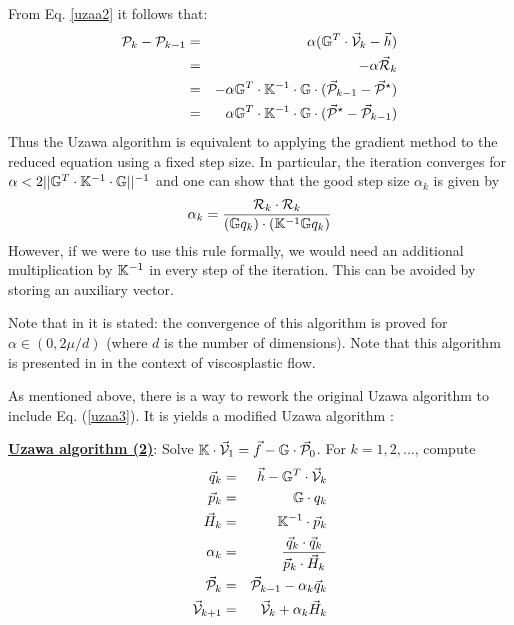 From Eq. \ref{uzaa2} it follows that:
\begin{eqnarray}
{\cal P}_k - {\cal P}_{k-1}  
&=& \alpha (\mathbb{G}^T\cdot \vec{\cal V}_k -\vec h) \\
&=& -\alpha \vec{\cal R}_k \\ 
&=& -\alpha \mathbb{G}^T \cdot \mathbb{K}^{-1} \cdot \mathbb{G}\cdot (\vec {\cal P}_{k-1} - \vec{\cal P}^\star)\\ 
&=& \alpha \mathbb{G}^T \cdot \mathbb{K}^{-1} \cdot \mathbb{G}\cdot 
(\vec{\cal P}^\star - \vec {\cal P}_{k-1} ) 
\end{eqnarray}
Thus the Uzawa algorithm is equivalent to applying the gradient method 
to the reduced equation using a fixed step size. 
In particular, the iteration converges for
$
\alpha < 2 || {\mathbb{G}}^T \cdot {\mathbb{K}}^{-1} \cdot {\mathbb{G}} ||^{-1}
$
and one can show that the good step size $\alpha_k$ is given by 
\begin{equation}
\alpha_k = \frac{{\cal R}_k \cdot {\cal R}_k}{({\mathbb{G}} q_k)\cdot ({\mathbb{K}}^{-1} {\mathbb{G}} q_k)}
\label{uzaa3}
\end{equation}
However, if we were to use this rule formally, we would 
need an additional multiplication by ${\mathbb{K}}^{-1}$ in every step 
of the iteration. This can be avoided by storing an 
auxiliary vector. 

Note that in \cite{glow} it is stated: the convergence of this algorithm is proved for 
$\alpha \in (0,2\mu/d)$ (where $d$ is the number of dimensions).
Note that this algorithm is presented in \cite{zivt85} in the context of viscosplastic flow.


As mentioned above, there is a way to rework the original Uzawa algorithm 
to include Eq. (\ref{uzaa3}). It is yields a modified 
Uzawa algorithm \cite[p221]{braess}:


\begin{mdframed}[backgroundcolor=blue!5]
\underline{\bf Uzawa algorithm (2)}:
Solve $\mathbb{K}\cdot \vec{\cal V}_1 = \vec f - \mathbb{G}\cdot  \vec{\cal P}_0$. 
For $k=1,2,...$, compute 
\begin{eqnarray}
\vec q_k &=& \vec h-\mathbb{G}^T \cdot \vec{\cal V}_k \\
\vec{p}_k &=& {{\mathbb{G}}}\cdot q_k \\
\vec H_k &=& {{\mathbb{K}}}^{-1}\cdot \vec{p}_k \\
\alpha_k &=& \frac{\vec q_k \cdot \vec q_k}{\vec{p}_k \cdot \vec H_k} \\
\vec {\cal P}_k &=& \vec {\cal P}_{k-1} - \alpha_k  \vec q_k \\
\vec {\cal V}_{k+1} &=& \vec {\cal V}_k + \alpha_k  \vec H_k
\end{eqnarray}
\end{mdframed}





